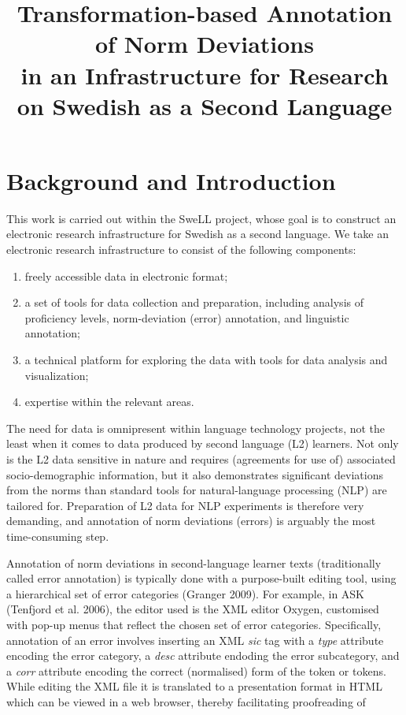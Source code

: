 \documentclass[10pt, a4paper]{article}
\title{Transformation-based Annotation of Norm Deviations \\ in an Infrastructure for Research on Swedish as a Second Language}
\begin{document}
\maketitleabstract

\section{Background and Introduction}

This work is carried out within the SweLL project, whose goal is to construct an electronic research infrastructure for Swedish as a second language. We take an electronic research infrastructure to consist of the following components:
\begin{enumerate}
\item freely accessible data in electronic format;
\item a set of tools for data collection and preparation, including
analysis of proficiency levels, norm-deviation (error) annotation, and linguistic annotation;
\item a technical platform for exploring the data with tools for data analysis and visualization;
\item expertise within the relevant areas.
\end{enumerate}

The need for data is omnipresent within language technology projects, not the least when it comes to data produced by second language (L2) learners. Not only is the L2 data sensitive in nature and requires (agreements for use of) associated socio-demographic information, but it also demonstrates significant deviations from the norms than standard tools for natural-language processing (NLP) are tailored for. Preparation of L2 data for NLP experiments is therefore very demanding, and annotation of norm deviations (errors) is arguably the most time-consuming step.

Annotation of norm deviations in second-language learner texts (traditionally
called error annotation) is typically done with a purpose-built editing tool,
using a hierarchical set of error categories (Granger 2009). For example,
in ASK (Tenfjord et al. 2006), the editor used is the XML editor Oxygen,
customised with pop-up menus that reflect the chosen set of error
categories. Specifically, annotation of an error involves inserting an XML
{\em sic} tag with a {\em type} attribute encoding the error category, a {\em
desc} attribute endoding the error subcategory, and a {\em corr} attribute
encoding the correct (normalised) form of the token or tokens.
While editing the XML file it is translated to a presentation format in HTML
which can be viewed in a web browser, thereby facilitating proofreading of
\end{document}
